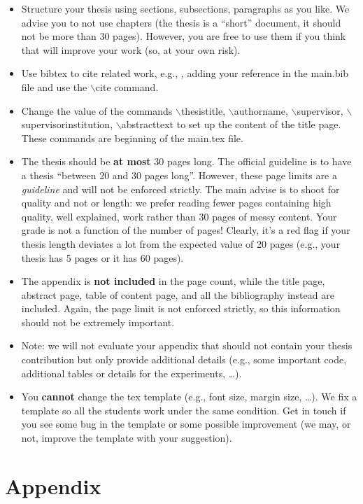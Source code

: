 \documentclass[oneside, a4paper, onecolumn, 11pt]{article}
\begin{document}
\begin{itemize}
\item Structure your thesis using sections, subsections, paragraphs as you like. We advise you to not use chapters (the thesis is a ``short'' document, it should not be more than 30 pages). However, you are free to use them if you think that will improve your work (so, at your own risk).
%
\item Use bibtex to cite related work, e.g., \cite{DBLP:journals/x/Turing37}, adding your reference in the {main.bib} file and use the {$\backslash$cite} command. 
%
\item Change the value of the commands {$\backslash$thesistitle}, {$\backslash$authorname}, {$\backslash$supervisor}, {$\backslash$supervisorinstitution}, {$\backslash$abstracttext} to set up the content of the title page. These commands are beginning of the {main.tex} file.
%
\item The thesis should be \textbf{at most} 30 pages long. The official guideline is to have a thesis ``between 20 and 30 pages long''. However, these page limits are a \emph{guideline} and will not be enforced strictly. 
%
The main advise is to shoot for quality and not or length: we prefer reading fewer pages containing high quality, well explained, work rather than 30 pages of messy content. Your grade is not a function of the number of pages!
%
Clearly, it's a red flag if your thesis length deviates a lot from the expected value of 20 pages (e.g., your thesis has 5 pages or it has 60 pages).
%
\item The appendix is \textbf{not included} in the page count, while the title page, abstract page, table of content page, and all the bibliography instead are included. Again, the page limit is not enforced strictly, so this information should not be extremely important.
%
\item Note: we will not evaluate your appendix that should not contain your thesis contribution but only provide additional details (e.g., some important code, additional tables or details for the experiments, \ldots).
%
\item You \textbf{cannot} change the tex template (e.g., font size, margin size, \ldots). We fix a template so all the students work under the same condition. Get in touch if you see some bug in the template or some possible improvement (we may, or not, improve the template with your suggestion).
% 
\end{itemize}


\newpage



\newpage
\appendix

\section{Appendix}
\label{sec:appendix}
\end{document}
